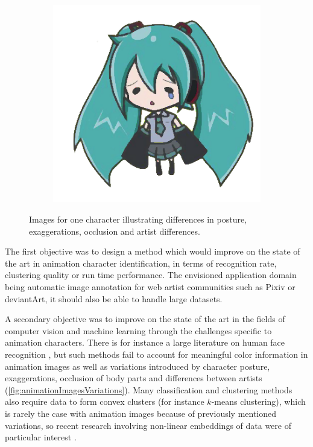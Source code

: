 \begin{figure}[htb!]
\begin{subfigure}{.3\textwidth}
\end{subfigure}
\begin{subfigure}{.3\textwidth}
\includegraphics[width=\textwidth]{images/miku_d.png}
\end{subfigure}
\caption{Images for one character illustrating differences in posture, exaggerations, occlusion and artist differences.}
\label{fig:animationImagesVariations}
\end{figure}

The first objective was to design a method which would improve on the state of the art in animation character identification, in terms of recognition rate, clustering quality or run time performance. The envisioned application domain being automatic image annotation for web artist communities such as Pixiv or deviantArt, it should also be able to handle large datasets.

A secondary objective was to improve on the state of the art in the fields of computer vision and machine learning through the challenges specific to animation characters. There is for instance a large literature on human face recognition \cite{turk1991eigenfaces} \cite{belhumeur1997eigenfaces}, but such methods fail to account for meaningful color information in animation images as well as variations introduced by character posture, exaggerations, occlusion of body parts and differences between artists (\autoref{fig:animationImagesVariations}). Many classification and clustering methods also require data to form convex clusters (for instance $k$-means clustering), which is rarely the case with animation images because of previously mentioned variations, so recent research involving non-linear embeddings of data were of particular interest \cite{roweis2000nonlinear} \cite{belkin2003laplacian} .

